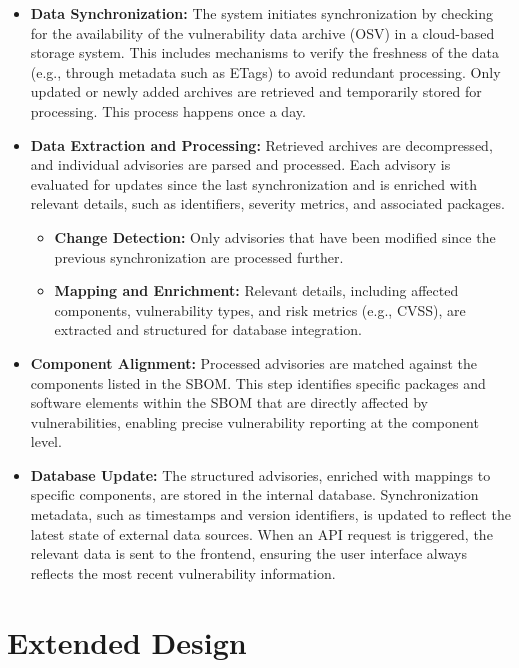 \begin{itemize}
    \item \textbf{Data Synchronization:} The system initiates synchronization by checking for the availability of the vulnerability data archive (\ac{OSV}) in a cloud-based storage system. This includes mechanisms to verify the freshness of the data (e.g., through metadata such as ETags) to avoid redundant processing. Only updated or newly added archives are retrieved and temporarily stored for processing. This process happens once a day.

    \item \textbf{Data Extraction and Processing:} Retrieved archives are decompressed, and individual advisories are parsed and processed. Each advisory is evaluated for updates since the last synchronization and is enriched with relevant details, such as identifiers, severity metrics, and associated packages. 
    \begin{itemize}
        \item \textbf{Change Detection:} Only advisories that have been modified since the previous synchronization are processed further.
        \item \textbf{Mapping and Enrichment:} Relevant details, including affected components, vulnerability types, and risk metrics (e.g., \ac{CVSS}), are extracted and structured for database integration.
    \end{itemize}

    \item \textbf{Component Alignment:} Processed advisories are matched against the components listed in the \ac{SBOM}. This step identifies specific packages and software elements within the \ac{SBOM} that are directly affected by vulnerabilities, enabling precise vulnerability reporting at the component level.

    \item \textbf{Database Update:} The structured advisories, enriched with mappings to specific components, are stored in the internal database. Synchronization metadata, such as timestamps and version identifiers, is updated to reflect the latest state of external data sources. When an \ac{API} request is triggered, the relevant data is sent to the frontend, ensuring the user interface always reflects the most recent vulnerability information.
\end{itemize}

\section{Extended Design}
\label{sec:extended-design}

